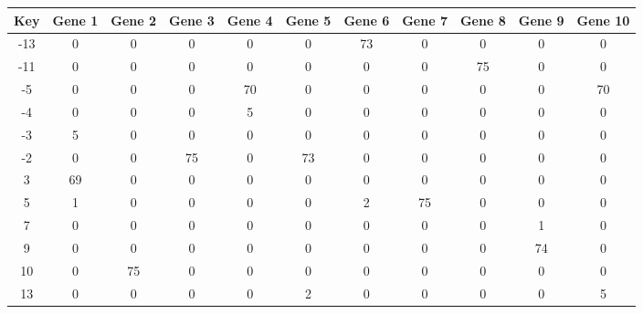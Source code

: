 \begin{tabular}{|c|c|c|c|c|c|c|c|c|c|c|}
\hline
Key & Gene 1 & Gene 2 & Gene 3 & Gene 4 & Gene 5 & Gene 6 & Gene 7 & Gene 8 & Gene 9 & Gene 10 \\
\hline
-13 & 0 & 0 & 0 & 0 & 0 & 73 & 0 & 0 & 0 & 0 \\
-11 & 0 & 0 & 0 & 0 & 0 & 0 & 0 & 75 & 0 & 0 \\
-5 & 0 & 0 & 0 & 70 & 0 & 0 & 0 & 0 & 0 & 70 \\
-4 & 0 & 0 & 0 & 5 & 0 & 0 & 0 & 0 & 0 & 0 \\
-3 & 5 & 0 & 0 & 0 & 0 & 0 & 0 & 0 & 0 & 0 \\
-2 & 0 & 0 & 75 & 0 & 73 & 0 & 0 & 0 & 0 & 0 \\
3 & 69 & 0 & 0 & 0 & 0 & 0 & 0 & 0 & 0 & 0 \\
5 & 1 & 0 & 0 & 0 & 0 & 2 & 75 & 0 & 0 & 0 \\
7 & 0 & 0 & 0 & 0 & 0 & 0 & 0 & 0 & 1 & 0 \\
9 & 0 & 0 & 0 & 0 & 0 & 0 & 0 & 0 & 74 & 0 \\
10 & 0 & 75 & 0 & 0 & 0 & 0 & 0 & 0 & 0 & 0 \\
13 & 0 & 0 & 0 & 0 & 2 & 0 & 0 & 0 & 0 & 5 \\
\hline
\end{tabular}
